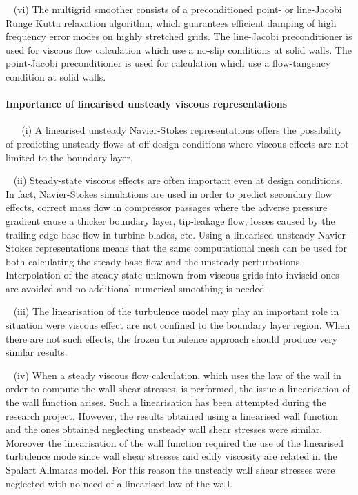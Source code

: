 ~\newline
 (vi)
 The multigrid smoother consists of a preconditioned
 point- or line-Jacobi Runge Kutta relaxation algorithm, which guarantees
 efficient damping of high frequency error modes on highly stretched grids.
 The line-Jacobi preconditioner is used for viscous flow calculation
 which use a no-slip conditions at solid walls.
 The point-Jacobi preconditioner is used for calculation which
 use a flow-tangency condition at solid walls.
%
%
%
%
\paragraph{Importance of linearised unsteady viscous representations}

~\newline
~\newline
 (i)
 A linearised unsteady Navier-Stokes representations 
 offers the possibility of predicting unsteady flows at
 off-design conditions where viscous
 effects are not limited to the boundary layer.
 
~\newline
 (ii) Steady-state viscous effects are often important even at design conditions.
 In fact, Navier-Stokes simulations are used in order to predict secondary flow
 effects, correct mass flow in compressor passages where the adverse pressure gradient
 cause a thicker boundary layer, tip-leakage flow, losses caused by the trailing-edge
 base flow in turbine blades, etc.
 Using a linearised unsteady Navier-Stokes representations means
 that the same computational mesh can be used for both calculating the steady
 base flow and the unsteady perturbations.
 Interpolation of the steady-state unknown from viscous grids into inviscid ones
 are avoided and no additional numerical smoothing is needed.
 
~\newline
 (iii)
 The linearisation of the turbulence model may play an important role in
 situation were viscous effect are not confined to the boundary layer
 region. When there are not such effects, the frozen turbulence approach
 should produce very similar results.
 
~\newline
 (iv)
 When a steady viscous flow calculation, which uses the law of the wall in order
 to compute the wall shear stresses, is performed,
 the issue a linearisation of the wall function arises.
 Such a linearisation has been attempted during the research project.
 However, the results obtained using a linearised wall function and
 the ones obtained neglecting unsteady wall shear stresses were
 similar. Moreover the linearisation of the wall function
 required the use of the linearised turbulence mode since
 wall shear stresses and eddy viscosity are related in the Spalart Allmaras
 model.
 For this reason the unsteady wall shear stresses were neglected
 with no need of a linearised law of the wall.
%
%
%
%
